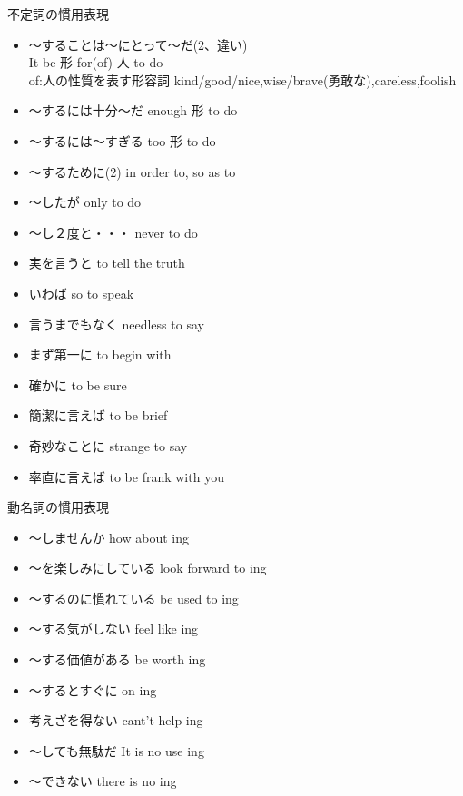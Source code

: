 \documentclass[10pt]{jsarticle}
\newcommand{\answer}[2]{{\color{orange}#2}}
\newcommand{\answer}[2]{\vspace{#1mm}}
\begin{document}
\begin{itembox}[l]{不定詞の慣用表現}
	\begin{multicols}{2}
		\begin{itemize}
			\item 〜することは〜にとって〜だ(2、違い)  \answer{10}{\\It be 形 for(of) 人 to do\\of:人の性質を表す形容詞 kind/good/nice,wise/brave(勇敢な),careless,foolish}
			\item 〜するには十分〜だ  \answer{10}{enough 形 to do}
			\item 〜するには〜すぎる  \answer{10}{too 形 to do}
			\item 〜するために(2)  \answer{10}{in order to, so as to}
			\item 〜したが  \answer{10}{only to do}
			\item 〜し２度と・・・  \answer{10}{never to do}
			\item 実を言うと  \answer{10}{to tell the truth}
			\item いわば  \answer{10}{so to speak}
			\item 言うまでもなく  \answer{10}{needless to say}
			\item まず第一に  \answer{10}{to begin with}
			\item 確かに  \answer{10}{to be sure}
			\item 簡潔に言えば  \answer{10}{to be brief}
			\item 奇妙なことに  \answer{10}{strange to say}
			\item 率直に言えば  \answer{10}{to be frank with you}
		\end{itemize}
	\end{multicols}
\end{itembox}

\begin{itembox}[l]{動名詞の慣用表現}
	\begin{multicols}{2}
		\begin{itemize}
			\item 〜しませんか  \answer{10}{how about ing}
			\item 〜を楽しみにしている  \answer{10}{look forward to ing}
			\item 〜するのに慣れている  \answer{10}{be used to ing}
			\item 〜する気がしない  \answer{10}{feel like ing}
			\item 〜する価値がある  \answer{10}{be worth ing}
			\item 〜するとすぐに  \answer{10}{on ing}
			\item 考えざを得ない  \answer{10}{cant't help ing}
			\item 〜しても無駄だ  \answer{10}{It is no use ing}
			\item 〜できない  \answer{10}{there is no ing}
		\end{itemize}
	\end{multicols}
\end{itembox}
\end{document}
